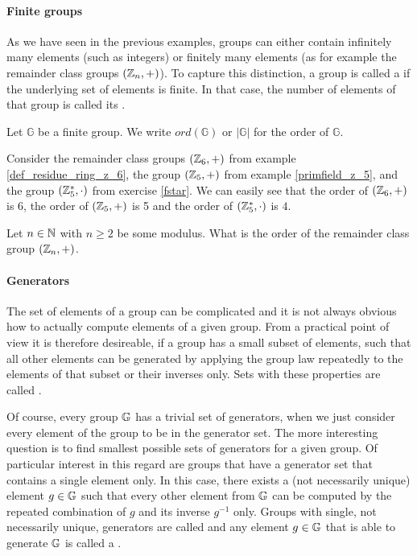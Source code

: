 \paragraph{Finite groups} As we have seen in the previous examples, groups can either contain infinitely many elements (such as integers) or finitely many elements (as for example the remainder class groups $(\mathbb{Z}_n,+)$). To capture this distinction, a group is called a  if the underlying set of elements is finite. In that case, the number of elements of that group is called its .
\begin{notation}
Let $\mathbb{G}$ be a finite group. We write $ord(\mathbb{G})$ or  $|\mathbb{G}|$ for the order of $\mathbb{G}$.
\end{notation}
\begin{example}\label{Zn}
Consider the remainder class groups $(\mathbb{Z}_6,+)$ from example \ref{def_residue_ring_z_6}, the group $(\mathbb{Z}_5,+)$ from example \ref{primfield_z_5}, and the group $(\mathbb{Z}_5^*,\cdot)$ from exercise \ref{fstar}. We can easily see that the order of $(\mathbb{Z}_6,+)$ is $6$, the order of $(\mathbb{Z}_5,+)$ is 5 and the order of $(\mathbb{Z}_5^*,\cdot)$ is $4$.
\end{example}
\begin{exercise}
\label{Zn} Let $n\in\mathbb{N}$ with $n\geq 2$ be some modulus. What is the order of the remainder class group $(\mathbb{Z}_n,+)$.
\end{exercise}
\paragraph{Generators}\label{generators} The set of elements of a group can be complicated and it is not always obvious how to actually compute elements of a given group. From a practical point of view it is therefore desireable, if a group has a small subset of elements, such that all other elements can be generated by applying the group law repeatedly to the elements of that subset or their inverses only. Sets with these properties are called .

Of course, every group $\mathbb{G}$ has a trivial set of generators, when we just consider every element of the group to be in the generator set. The more interesting question is to find smallest possible sets of generators for a given group. Of particular interest in this regard are groups that have a generator set that contains a single element only. In this case, there exists a (not necessarily unique) element $g\in\mathbb{G}$ such that every other element from $\mathbb{G}$ can be computed by the repeated combination of $g$ and its inverse $g^{-1}$ only. Groups with single, not necessarily unique, generators are called \label{cyclic-groups} and any element $g\in \mathbb{G}$ that is able to generate $\mathbb{G}$ is called a .

